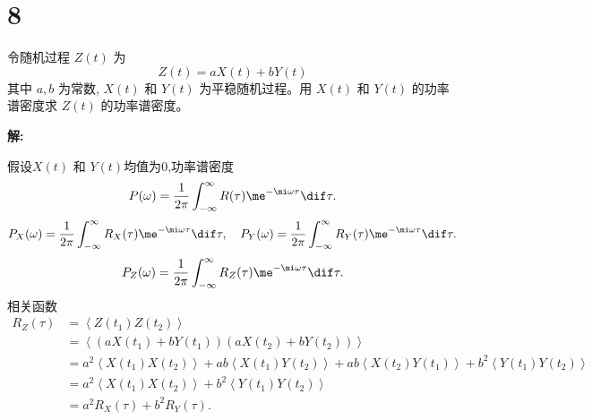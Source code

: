 \documentclass[12pt,a4]{ctexart}
\begin{document}
\section{8}


令随机过程 $Z(t)$ 为
\begin{equation}
	Z(t)=a X(t)+b Y(t)
\end{equation}
其中 $a, b$ 为常数, $X(t)$ 和 $Y(t)$ 为平稳随机过程。用 $X(t)$ 和 $Y(t)$ 的功率谱密度求 $Z(t)$ 的功率谱密度。

\textsf{\hspace{-2em}\sf  \textbf{解:}}

假设$X(t)$ 和 $Y(t)$均值为$0$,功率谱密度\cite[P101]{suiji}
\begin{equation}
	P(\omega)  =\frac{1}{2\pi} \int^{\infty}_{-\infty} R(\tau) \me^{-\mi \omega \tau} \dif \tau.
\end{equation}
\begin{equation}
	P_X(\omega)  =\frac{1}{2\pi} \int^{\infty}_{-\infty} R_X(\tau) \me^{-\mi \omega \tau} \dif \tau, \quad P_Y(\omega)  =\frac{1}{2\pi} \int^{\infty}_{-\infty} R_Y(\tau) \me^{-\mi \omega \tau} \dif \tau.
\end{equation}
\begin{equation}
	P_Z(\omega)  =\frac{1}{2\pi} \int^{\infty}_{-\infty} R_Z(\tau) \me^{-\mi \omega \tau} \dif \tau.
\end{equation}
相关函数
\begin{equation}
	\begin{aligned}
		R_Z(\tau) & = \left\langle Z(t_1) Z(t_2)\right\rangle                                                                                                                                                  \\
		          & = \left\langle (a X(t_1)+b Y(t_1)) (a X(t_2)+b Y(t_2)) \right\rangle                                                                                                                       \\
		          & = a^2 \left\langle X(t_1) X(t_2) \right\rangle + ab \left\langle X(t_1) Y(t_2) \right\rangle + ab \left\langle X(t_2) Y(t_1) \right\rangle  + b^2 \left\langle Y(t_1) Y(t_2) \right\rangle \\
		          & = a^2 \left\langle X(t_1) X(t_2) \right\rangle + b^2 \left\langle Y(t_1) Y(t_2) \right\rangle                                                                                              \\
		          & = a^2 R_X(\tau) + b^2 R_Y(\tau).                                                                                                                                                           \\
	\end{aligned}
\end{equation}
\end{document}

